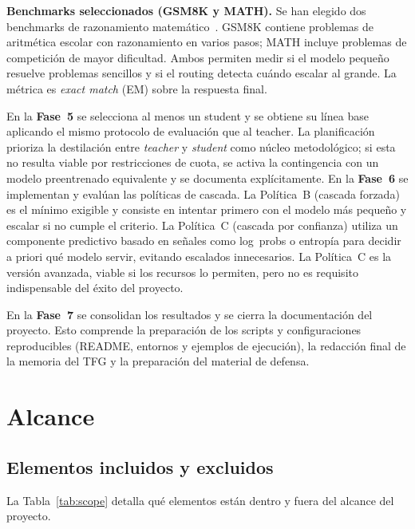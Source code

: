 \documentclass[11pt,a4paper]{article}
\begin{document}
\textbf{Benchmarks seleccionados (GSM8K y MATH).} Se han elegido dos benchmarks de razonamiento matemático~\cite{cobbe2021gsm8k, hendrycks2021math}. GSM8K contiene problemas de aritmética escolar con razonamiento en varios pasos; MATH incluye problemas de competición de mayor dificultad. Ambos permiten medir si el modelo pequeño resuelve problemas sencillos y si el routing detecta cuándo escalar al grande. La métrica es \textit{exact match} (EM) sobre la respuesta final.

En la \textbf{Fase~5} se selecciona al menos un student y se obtiene su línea base aplicando el mismo protocolo de evaluación que al teacher. La planificación prioriza la destilación entre \textit{teacher} y \textit{student} como núcleo metodológico; si esta no resulta viable por restricciones de cuota, se activa la contingencia con un modelo preentrenado equivalente y se documenta explícitamente. En la \textbf{Fase~6} se implementan y evalúan las políticas de cascada. La Política~B (cascada forzada) es el mínimo exigible y consiste en intentar primero con el modelo más pequeño y escalar si no cumple el criterio. La Política~C (cascada por confianza) utiliza un componente predictivo basado en señales como log~probs o entropía para decidir a priori qué modelo servir, evitando escalados innecesarios. La Política~C es la versión avanzada, viable si los recursos lo permiten, pero no es requisito indispensable del éxito del proyecto.

En la \textbf{Fase~7} se consolidan los resultados y se cierra la documentación del proyecto. Esto comprende la preparación de los scripts y configuraciones reproducibles (README, entornos y ejemplos de ejecución), la redacción final de la memoria del TFG y la preparación del material de defensa.

\section{Alcance}

\subsection{Elementos incluidos y excluidos}

La Tabla~\ref{tab:scope} detalla qué elementos están dentro y fuera del alcance del proyecto.
\end{document}
